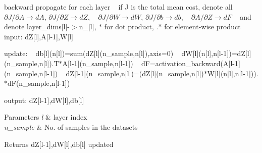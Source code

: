 backward propagate for each layer ~\newline
 if J is the total mean cost, denote all ~\newline
 $\partial{J}/\partial{A}\to dA$, $\partial{J}/\partial{Z}\to dZ$, ~\newline
 $\partial{J}/\partial{W}\to dW$, $\partial{J}/\partial{b}\to db$, ~\newline
 $\partial{A}/\partial{Z}\to dF$ ~\newline
 and denote layer\+\_\+dims\mbox{[}l\mbox{]}-\/$>$n\+\_\+\mbox{[}l\mbox{]}, $\ast$ for dot product, .$\ast$ for element-\/wise product ~\newline
 input\+: dZ\mbox{[}l\mbox{]},A\mbox{[}l-\/1\mbox{]},W\mbox{[}l\mbox{]} ~\newline


update\+: ~\newline
 db\mbox{[}l\mbox{]}(n\mbox{[}l\mbox{]})=sum(dZ\mbox{[}l\mbox{]}(n\+\_\+sample,n\mbox{[}l\mbox{]}),axis=0) ~\newline
 dW\mbox{[}l\mbox{]}(n\mbox{[}l\mbox{]},n\mbox{[}l-\/1\mbox{]})=dZ\mbox{[}l\mbox{]}(n\+\_\+sample,n\mbox{[}l\mbox{]}).T$\ast$A\mbox{[}l-\/1\mbox{]}(n\+\_\+sample,n\mbox{[}l-\/1\mbox{]}) ~\newline
 dF=activation\+\_\+backward(A\mbox{[}l-\/1\mbox{]}(n\+\_\+sample,n\mbox{[}l-\/1\mbox{]}) ~\newline
 dZ\mbox{[}l-\/1\mbox{]}(n\+\_\+sample,n\mbox{[}l\mbox{]})=(dZ\mbox{[}l\mbox{]}(n\+\_\+sample,n\mbox{[}l\mbox{]})$\ast$W\mbox{[}l\mbox{]}(n\mbox{[}l\mbox{]},n\mbox{[}l-\/1\mbox{]})).$\ast$dF(n\+\_\+sample,n\mbox{[}l-\/1\mbox{]}) ~\newline


output\+: dZ\mbox{[}l-\/1\mbox{]},dW\mbox{[}l\mbox{]},db\mbox{[}l\mbox{]} ~\newline
 
\begin{DoxyParams}{Parameters}
{\em l} & layer index \\
\hline
{\em n\+\_\+sample} & No. of samples in the datasets \\
\hline
\end{DoxyParams}
\begin{DoxyReturn}{Returns}
dZ\mbox{[}l-\/1\mbox{]},dW\mbox{[}l\mbox{]},db\mbox{[}l\mbox{]} updated 
\end{DoxyReturn}
\mbox{\label{classdnn_afe3252fc51fda18ec793933157bad7b8}} 
